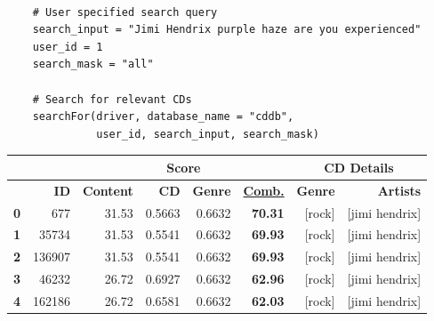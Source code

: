 \documentclass{article}
\begin{document}
\begin{lstlisting}

    # User specified search query
    search_input = "Jimi Hendrix purple haze are you experienced"
    user_id = 1
    search_mask = "all"

    # Search for relevant CDs
    searchFor(driver, database_name = "cddb", 
              user_id, search_input, search_mask)
\end{lstlisting}

\begin{table}[!htbp]
    \begin{tabular}{rr|rrrr|rr|}
        \cline{3-8}
        \multicolumn{1}{l}{} & \multicolumn{1}{l|}{} & \multicolumn{4}{c|}{\textbf{Score}}   & \multicolumn{2}{c|}{\textbf{CD Details}}                                                                                                                            \\ \hline
        \textbf{}            & \textbf{ID}           & \multicolumn{1}{r|}{\textbf{Content}} & \multicolumn{1}{r|}{\textbf{CD}}         & \multicolumn{1}{r|}{\textbf{Genre}} & {\ul \textbf{Comb.}} & \multicolumn{1}{r|}{\textbf{Genre}} & \textbf{Artists}      \\ \hline
        \textbf{0}           & 677                   & 31.53                                 & 0.5663                                   & 0.6632                              & \textbf{70.31}       & {[}rock{]}                          & {[}jimi hendrix{]}    \\
        \textbf{1}           & 35734                 & 31.53                                 & 0.5541                                   & 0.6632                              & \textbf{69.93}       & {[}rock{]}                          & {[}jimi hendrix{]}    \\
        \textbf{2}           & 136907                & 31.53                                 & 0.5541                                   & 0.6632                              & \textbf{69.93}       & {[}rock{]}                          & {[}jimi hendrix{]}    \\
        \textbf{3}           & 46232                 & 26.72                                 & 0.6927                                   & 0.6632                              & \textbf{62.96}       & {[}rock{]}                          & {[}jimi hendrix{]}    \\
        \textbf{4}           & 162186                & 26.72                                 & 0.6581                                   & 0.6632                              & \textbf{62.03}       & {[}rock{]}                          & {[}jimi hendrix{]}    \\

\end{tabular}
\end{table}
\end{document}
